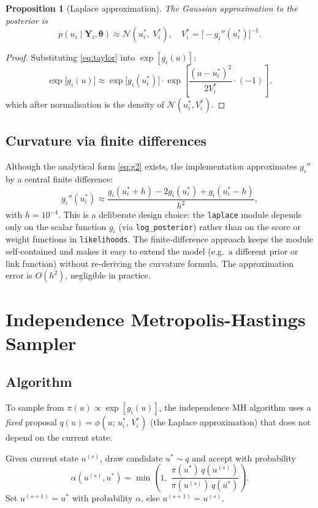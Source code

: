 \documentclass[11pt,a4paper]{article}
\newtheorem{proposition}[theorem]{Proposition}
\theoremstyle{definition}
\theoremstyle{remark}
\newcommand{\N}{\mathcal{N}}
\newcommand{\bY}{\mathbf{Y}}
\newcommand{\btheta}{\boldsymbol{\theta}}
\newcommand{\given}{\mid}
\begin{document}
\begin{proposition}[Laplace approximation]
The Gaussian approximation to the posterior is
\[
  p(u_i \given \bY_i, \btheta) \approx \N\!\left(u_i^*,\; V_i^*\right),
  \quad V_i^* = \bigl[-g_i''(u_i^*)\bigr]^{-1}.
\]
\end{proposition}

\begin{proof}
Substituting \eqref{eq:taylor} into $\exp[g_i(u)]$:
\[
  \exp\bigl[g_i(u)\bigr] \approx
  \exp\bigl[g_i(u_i^*)\bigr]\cdot
  \exp\!\left[\frac{(u-u_i^*)^2}{2V_i^*}\cdot(-1)\right],
\]
which after normalisation is the density of $\N(u_i^*, V_i^*)$.
\end{proof}

\subsection{Curvature via finite differences}

Although the analytical form \eqref{eq:g2} exists, the implementation
approximates $g_i''$ by a central finite difference:
\[
  g_i''(u_i^*) \approx \frac{g_i(u_i^*+h) - 2g_i(u_i^*) + g_i(u_i^*-h)}{h^2},
\]
with $h = 10^{-4}$.  This is a deliberate design choice: the \texttt{laplace}
module depends only on the scalar function $g_i$ (via \texttt{log\_posterior})
rather than on the score or weight functions in \texttt{likelihoods}.  The
finite-difference approach keeps the module self-contained and makes it easy
to extend the model (e.g.\ a different prior or link function) without
re-deriving the curvature formula.  The approximation error is $O(h^2)$,
negligible in practice.

\section{Independence Metropolis-Hastings Sampler}

\subsection{Algorithm}

To sample from $\pi(u) \propto \exp[g_i(u)]$, the independence MH algorithm
uses a \emph{fixed} proposal $q(u) = \phi(u;\, u_i^*,\, V_i^*)$ (the Laplace
approximation) that does not depend on the current state.

Given current state $u^{(s)}$, draw candidate $u^* \sim q$ and accept with
probability
\begin{equation}
  \alpha(u^{(s)}, u^*) = \min\!\left(1,\;
    \frac{\pi(u^*)\,q(u^{(s)})}{\pi(u^{(s)})\,q(u^*)}\right).
  \label{eq:mh-accept}
\end{equation}
Set $u^{(s+1)} = u^*$ with probability $\alpha$, else $u^{(s+1)} = u^{(s)}$.
\end{document}

